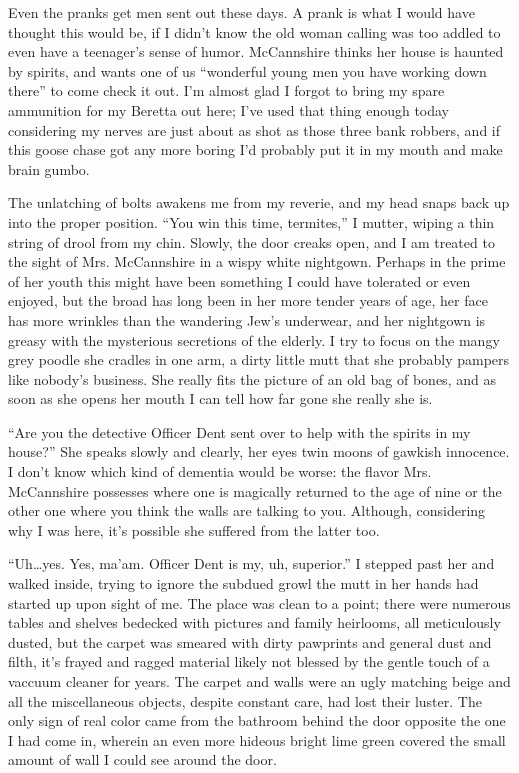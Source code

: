 Even the pranks get men sent out these days. A prank is what I
would have thought this would be, if I didn't know the old woman
calling was too addled to even have a teenager's sense of humor.
McCannshire thinks her house is haunted by spirits, and wants one
of us ``wonderful young men you have working down there'' to come
check it out. I'm almost glad I forgot to bring my spare ammunition
for my Beretta out here; I've used that thing enough today
considering my nerves are just about as shot as those three bank
robbers, and if this goose chase got any more boring I'd probably
put it in my mouth and make brain gumbo.



The unlatching of bolts awakens me from my reverie, and my head
snaps back up into the proper position. ``You win this time,
termites,'' I mutter, wiping a thin string of drool from my chin.
Slowly, the door creaks open, and I am treated to the sight of Mrs.
McCannshire in a wispy white nightgown. Perhaps in the prime of her
youth this might have been something I could have tolerated or even
enjoyed, but the broad has long been in her more tender years of
age, her face has more wrinkles than the wandering Jew's underwear,
and her nightgown is greasy with the mysterious secretions of the
elderly. I try to focus on the mangy grey poodle she cradles in one
arm, a dirty little mutt that she probably pampers like nobody's
business. She really fits the picture of an old bag of bones, and
as soon as she opens her mouth I can tell how far gone she really
she is.



``Are you the detective Officer Dent sent over to help with the
spirits in my house?'' She speaks slowly and clearly, her eyes twin
moons of gawkish innocence. I don't know which kind of dementia
would be worse: the flavor Mrs. McCannshire possesses where one is
magically returned to the age of nine or the other one where you
think the walls are talking to you. Although, considering why I was
here, it's possible she suffered from the latter too.



``Uh{\ldots}yes. Yes, ma'am. Officer Dent is my, uh, superior.'' I stepped
past her and walked inside, trying to ignore the subdued growl the
mutt in her hands had started up upon sight of me. The place was
clean to a point; there were numerous tables and shelves bedecked
with pictures and family heirlooms, all meticulously dusted, but
the carpet was smeared with dirty pawprints and general dust and
filth, it's frayed and ragged material likely not blessed by the
gentle touch of a vaccuum cleaner for years. The carpet and walls
were an ugly matching beige and all the miscellaneous objects,
despite constant care, had lost their luster. The only sign of real
color came from the bathroom behind the door opposite the one I had
come in, wherein an even more hideous bright lime green covered the
small amount of wall I could see around the door.



